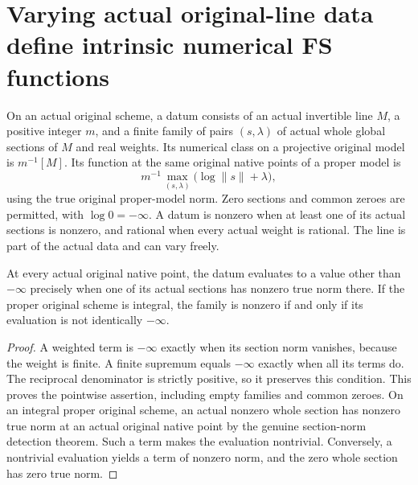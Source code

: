 \section{Varying actual original-line data define intrinsic numerical FS functions}
\label{sec:native-numerical-fubini-study}

\begin{definition}
\label{def:native-numerical-whole-section-fs-data}
\leanok
{}
On an actual original scheme, a datum consists of an actual invertible line
$M$, a positive integer $m$, and a finite family of pairs $(s,\lambda)$ of
actual whole global sections of $M$ and real weights. Its numerical class
on a projective original model is $m^{-1}[M]$. Its function at the same
original native points of a proper model is
\[
 m^{-1}\max_{(s,\lambda)}\bigl(\log\|s\|+\lambda\bigr),
\]
using the true original proper-model norm. Zero sections and common zeroes
are permitted, with $\log0=-\infty$. A datum is nonzero when at least one of
its actual sections is nonzero, and rational when every actual weight is
rational. The line is part of the actual data and can vary freely.
\end{definition}

\begin{theorem}
\label{thm:native-numerical-fs-nonvanishing}
\leanok
{}
At every actual original native point, the datum evaluates to a value
other than $-\infty$ precisely when one of its actual sections has nonzero
true norm there. If the proper original scheme is integral, the family is
nonzero if and only if its evaluation is not identically $-\infty$.
\end{theorem}
\begin{proof}
A weighted term is $-\infty$ exactly when its section norm vanishes, because
the weight is finite. A finite supremum equals $-\infty$ exactly when all
its terms do. The reciprocal denominator is strictly positive, so it
preserves this condition. This proves the pointwise assertion, including
empty families and common zeroes. On an integral proper original scheme,
an actual nonzero whole section has nonzero true norm at an actual original
native point by the genuine section-norm detection theorem. Such a term
makes the evaluation nontrivial. Conversely, a nontrivial evaluation yields
a term of nonzero norm, and the zero whole section has zero true norm.
\end{proof}

